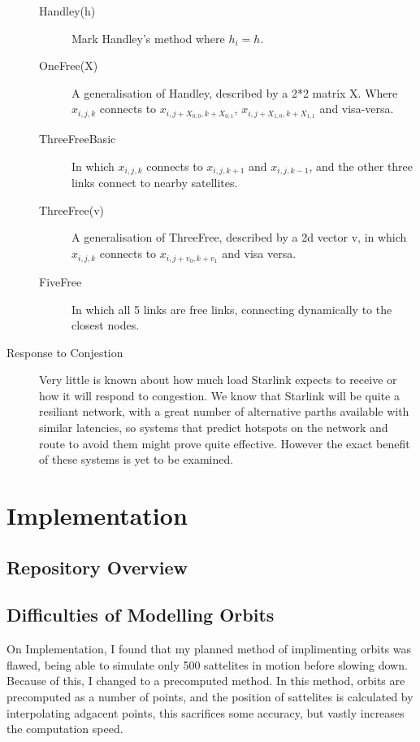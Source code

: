 \documentclass[12pt]{article}
\begin{document}
\begin{description}
\begin{description}
\item[Handley(h)] Mark Handley's method where $h_i = h$.
\item[OneFree(X)] A generalisation of Handley, described by a 2*2 matrix X. Where $x_{i,j,k}$ connects to $x_{i,j+X_{0,0},k+X_{0,1}}$, $x_{i,j+X_{1,0},k+X_{1,1}}$ and visa-versa.
\item[ThreeFreeBasic] In which $x_{i,j,k}$ connects to $x_{i,j,k+1}$ and $x_{i,j,k-1}$, and the other three links connect to nearby satellites.
\item[ThreeFree(v)] A generalisation of ThreeFree, described by a 2d vector v, in which $x_{i,j,k}$ connects to $x_{i,j+v_0,k+v_1}$ and visa versa.
\item[FiveFree] In which all 5 links are free links, connecting dynamically to the closest nodes.
\end{description}

\item[Response to Conjestion]
Very little is known about how much load Starlink expects to receive or how it will respond to congestion. We know that Starlink will be quite a resiliant network, with a great number of alternative parths available with similar latencies, so systems that predict hotspots on the network and route to avoid them might prove quite effective. However the exact benefit of these systems is yet to be examined.
\end{description}

\section{Implementation}

\subsection{Repository Overview}

\subsection{Difficulties of Modelling Orbits}
On Implementation, I found that my planned method  of implimenting orbits was flawed, being able to simulate only 500 sattelites in motion before slowing down. Because of this, I changed to a precomputed method. In this method, orbits are precomputed as a number of points, and the position of sattelites is calculated by interpolating adgacent points, this sacrifices some accuracy, but vastly increases the computation speed.
\end{document}
